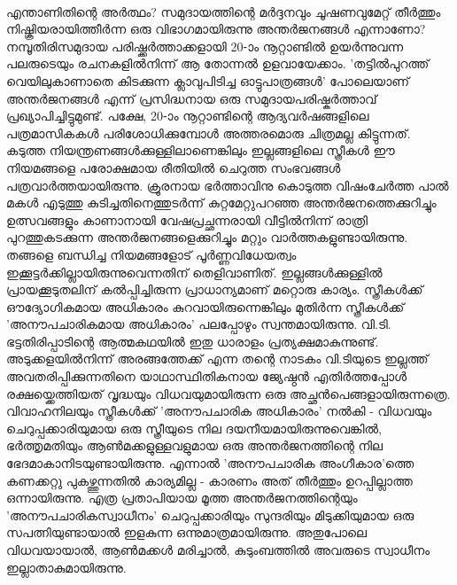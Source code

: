 \paragraph{}എന്താണിതിന്റെ അർത്ഥം? സമുദായത്തിന്റെ മർദ്ദനവും ചൂഷണവുമേറ്റ് തീർത്തും നിഷ്ക്രിയരായിത്തീർന്ന ഒരു വിഭാഗമായിരുന്നു അന്തർജനങ്ങൾ എന്നാണോ? നമ്പൂതിരിസമുദായ പരിഷ്ക്കർത്താക്കളായി 20-ാം നൂറ്റാണ്ടിൽ ഉയർന്നുവന്ന പലരുടെയും രചനകളിൽനിന്ന് ആ തോന്നൽ ഉളവായേക്കാം. 'തട്ടിൽപുറത്ത് വെയിലുകാണാതെ കിടക്കുന്ന ക്ലാവുപിടിച്ച ഓട്ടുപാത്രങ്ങൾ' പോലെയാണ് അന്തർജനങ്ങൾ എന്ന് പ്രസിദ്ധനായ ഒരു സമുദായപരിഷ്കർത്താവ് പ്രഖ്യാപിച്ചിട്ടുമുണ്ട്. പക്ഷേ, 20-ാം നൂറ്റാണ്ടിന്റെ ആദ്യവർഷങ്ങളിലെ പത്രമാസികകൾ പരിശോധിക്കുമ്പോൾ അത്തരമൊരു ചിത്രമല്ല കിട്ടുന്നത്. കടുത്ത നിയന്ത്രണങ്ങൾക്കുള്ളിലാണെങ്കിലും ഇല്ലങ്ങളിലെ സ്ത്രീകൾ ഈ നിയമങ്ങളെ പരോക്ഷമായ രീതിയിൽ ചെറുത്ത സംഭവങ്ങൾ പത്രവാർത്തയായിരുന്നു. ക്രൂരനായ ഭർത്താവിനു കൊടുത്ത വിഷംചേർത്ത പാൽ മകൾ എടുത്തു കുടിച്ചതിനെത്തുടർന്ന് കുറ്റമേറ്റുപറഞ്ഞ അന്തർജനത്തെക്കുറിച്ചും ഉത്സവങ്ങളും കാണാനായി വേഷപ്രച്ഛന്നരായി വീട്ടിൽനിന്ന് രാത്രി പുറത്തുകടക്കുന്ന അന്തർജനങ്ങളെക്കുറിച്ചും മറ്റും വാർത്തകളുണ്ടായിരുന്നു. തങ്ങളെ ബന്ധിച്ച നിയമങ്ങളോട് പൂർണ്ണവിധേയത്വം ഇക്കൂട്ടർക്കില്ലായിരുന്നുവെന്നതിന് തെളിവാണിത്. ഇല്ലങ്ങൾക്കുള്ളിൽ പ്രായക്കൂടുതലിന് കൽപ്പിച്ചിരുന്ന പ്രാധാന്യമാണ് മറ്റൊരു കാര്യം. സ്ത്രീകൾക്ക് ഔദ്യോഗികമായ അധികാരം കുറവായിരുന്നെങ്കിലും മുതിർന്ന സ്ത്രീകൾക്ക് 'അനൗപചാരികമായ അധികാരം' പലപ്പോഴും സ്വന്തമായിരുന്നു. വി.ടി. ഭട്ടതിരിപ്പാടിന്റെ ആത്മകഥയിൽ ഇതു ധാരാളം പ്രത്യക്ഷമാകുന്നുണ്ട്. അടുക്കളയിൽനിന്ന് അരങ്ങത്തേക്ക് എന്ന തന്റെ നാടകം വി.ടിയുടെ ഇല്ലത്ത് അവതരിപ്പിക്കുന്നതിനെ യാഥാസ്ഥിതികനായ ജ്യേഷ്ഠൻ എതിർത്തപ്പോൾ രക്ഷയ്ക്കെത്തിയത് വൃദ്ധയും വിധവയുമായിരുന്ന ഒരു അച്ഛൻപെങ്ങളായിരുന്നത്രെ. വിവാഹനിലയും സ്ത്രീകൾക്ക് 'അനൗപചാരിക അധികാരം' നൽകി - വിധവയും ചെറുപ്പക്കാരിയുമായ ഒരു സ്ത്രീയുടെ നില ദയനീയമായിരുന്നുവെങ്കിൽ, ഭർത്തൃമതിയും ആൺമക്കളുള്ളവളുമായ ഒരു അന്തർജനത്തിന്റെ നില ഭേദമാകാനിടയുണ്ടായിരുന്നു. എന്നാൽ 'അനൗപചാരിക അംഗീകാര'ത്തെ കണക്കറ്റു പുകഴ്ത്തുന്നതിൽ കാര്യമില്ല - കാരണം അത് തീർത്തും ഉറപ്പില്ലാത്ത ഒന്നായിരുന്നു. എത്ര പ്രതാപിയായ മൂത്ത അന്തർജനത്തിന്റെയും 'അനൗപചാരികസ്വാധീനം' ചെറുപ്പക്കാരിയും സുന്ദരിയും മിടുക്കിയുമായ ഒരു സപത്നിയുണ്ടായാൽ ഇളകുന്ന ഒന്നുമാത്രമായിരുന്നു. അതുപോലെ വിധവയായാൽ, ആൺമക്കൾ മരിച്ചാൽ, കുടുംബത്തിൽ അവരുടെ സ്വാധീനം ഇല്ലാതാകുമായിരുന്നു.

